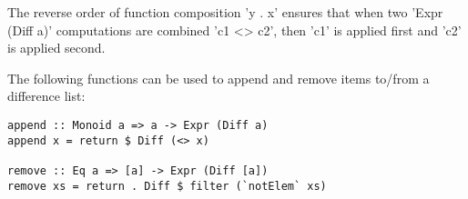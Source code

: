 \noindent The reverse order of function composition \lst'y . x' ensures that
when two \lst'Expr (Diff a)' computations are combined \lst'c1 <> c2', then
\lst'c1' is applied first and \lst'c2' is applied second.

The following functions can be used to append and remove items to/from a
difference list:

\begin{lstlisting}
append :: Monoid a => a -> Expr (Diff a)
append x = return $ Diff (<> x)

remove :: Eq a => [a] -> Expr (Diff [a])
remove xs = return . Diff $ filter (`notElem` xs)
\end{lstlisting}

\newcommand{\tabx}[1]{\hspace{.106\textwidth}\rlap{#1}}
\newcommand{\taby}[1]{\hspace{.103\textwidth}\rlap{#1}}
\newcommand{\tabz}[1]{\hspace{.24\textwidth}\rlap{#1}}

